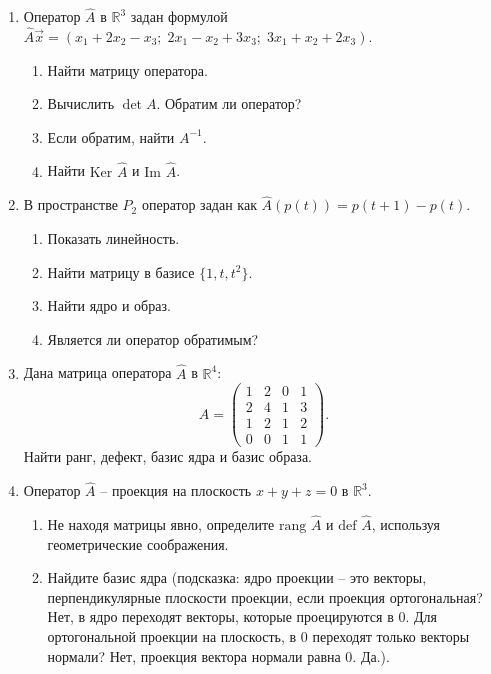 \documentclass[12pt,a4paper]{article}
\theoremstyle{plain}
\theoremstyle{definition}
\begin{document}
\begin{enumerate}[leftmargin=*, label=\arabic*.]
    \item Оператор $\hat{A}$ в $\mathbb{R}^3$ задан формулой $\hat{A}\vec{x} = (x_1 + 2x_2 - x_3; \; 2x_1 - x_2 + 3x_3; \; 3x_1 + x_2 + 2x_3)$.
    \begin{enumerate}
        \item Найти матрицу оператора.
        \item Вычислить $\det A$. Обратим ли оператор?
        \item Если обратим, найти $A^{-1}$.
        \item Найти $\text{Ker } \hat{A}$ и $\text{Im } \hat{A}$.
    \end{enumerate}

    \item В пространстве $P_2$ оператор задан как $\hat{A}(p(t)) = p(t+1) - p(t)$.
    \begin{enumerate}
        \item Показать линейность.
        \item Найти матрицу в базисе $\{1, t, t^2\}$.
        \item Найти ядро и образ.
        \item Является ли оператор обратимым?
    \end{enumerate}

    \item Дана матрица оператора $\hat{A}$ в $\mathbb{R}^4$:
    \[
    A = \begin{pmatrix} 1 & 2 & 0 & 1 \\ 2 & 4 & 1 & 3 \\ 1 & 2 & 1 & 2 \\ 0 & 0 & 1 & 1 \end{pmatrix}.
    \]
    Найти ранг, дефект, базис ядра и базис образа.

    \item Оператор $\hat{A}$ -- проекция на плоскость $x + y + z = 0$ в $\mathbb{R}^3$.
    \begin{enumerate}
        \item Не находя матрицы явно, определите $\text{rang } \hat{A}$ и $\text{def } \hat{A}$, используя геометрические соображения.
        \item Найдите базис ядра (подсказка: ядро проекции -- это векторы, перпендикулярные плоскости проекции, если проекция ортогональная? Нет, в ядро переходят векторы, которые проецируются в 0. Для ортогональной проекции на плоскость, в 0 переходят только векторы нормали? Нет, проекция вектора нормали равна 0. Да.).
    \end{enumerate}


\end{enumerate}
\end{document}
